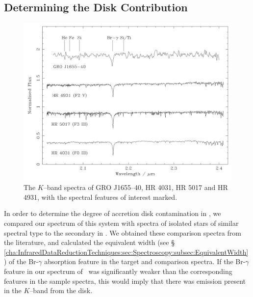 \subsection{Determining the Disk Contribution}
\label{cha:AccretionDiskContamination:sec:Spectroscopy:subsec:DiskContribution}

\begin{figure}[!htb]
\begin{center}
\includegraphics[width=5.0in]{combinedSpectra}
\caption{%
The $K$--band spectra of GRO J1655--40, HR 4031, HR 5017 and HR 4931, with the
spectral features of interest marked.}
\label{cha:AccretionDiskContamination:sec:Spectroscopy:subsec:DiskContribution:fig:combinedSpectra}
\end{center}
\end{figure}


In order to determine the degree of accretion disk contamination in
\groj, we compared our spectrum of this system with spectra of
isolated stars of similar spectral type to the secondary in \groj. We
obtained these comparison spectra from the literature, and calculated
the equivalent width (see
\S~%
\vref{cha:InfraredDataReductionTechniques:sec:Spectroscopy:subsec:EquivalentWidth}%
) of the Br-$\gamma$ absorption feature in the target and comparison
spectra. If the Br-$\gamma$ feature in our spectrum of \groj\ was
significantly weaker than the corresponding features in the sample
spectra, this would imply that there was emission present in the $K$--band from the
disk. %

